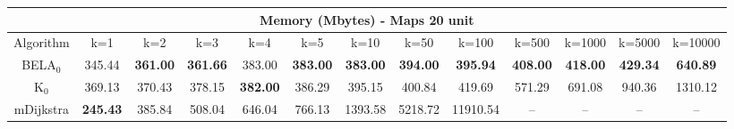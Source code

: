 \begin{tabular}{c|cccccccccccc}\toprule
\multicolumn{13}{c}{Memory (Mbytes) - Maps 20 unit}\\ \midrule
Algorithm & k=1 & k=2 & k=3 & k=4 & k=5 & k=10 & k=50 & k=100 & k=500 & k=1000 & k=5000 & k=10000 \\ \midrule
BELA$_0$ & 345.44 & \textbf{361.00} & \textbf{361.66} & 383.00 & \textbf{383.00} & \textbf{383.00} & \textbf{394.00} & \textbf{395.94} & \textbf{408.00} & \textbf{418.00} & \textbf{429.34} & \textbf{640.89} \\
K$_0$ & 369.13 & 370.43 & 378.15 & \textbf{382.00} & 386.29 & 395.15 & 400.84 & 419.69 & 571.29 & 691.08 & 940.36 & 1310.12 \\
mDijkstra & \textbf{245.43} & 385.84 & 508.04 & 646.04 & 766.13 & 1393.58 & 5218.72 & 11910.54 & -- & -- & -- & -- \\ \bottomrule 
\end{tabular}
